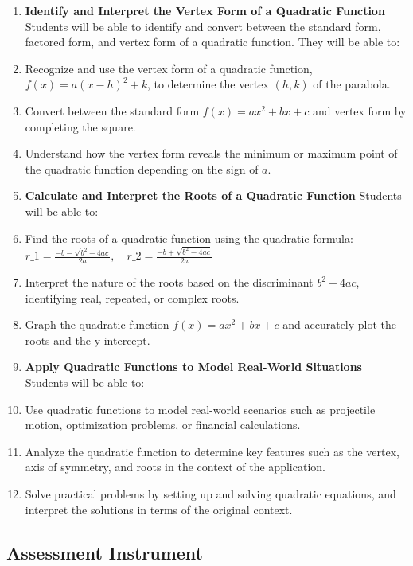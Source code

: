 \begin{enumerate}
    \item \textbf{Identify and Interpret the Vertex Form of a Quadratic Function} Students will be able to identify and convert between the standard form, factored form, and vertex form of a quadratic function. They will be able to:
    \item Recognize and use the vertex form of a quadratic function, $f(x) = a(x - h)^2 + k$, to determine the vertex $(h, k)$ of the parabola.
    \item Convert between the standard form $f(x) = ax^2 + bx + c$ and vertex form by completing the square.
    \item Understand how the vertex form reveals the minimum or maximum point of the quadratic function depending on the sign of $a$.
    \item \textbf{Calculate and Interpret the Roots of a Quadratic Function} Students will be able to:
    \item Find the roots of a quadratic function using the quadratic formula: $ r\_1 = \frac{-b - \sqrt{b^2 - 4ac}}{2a}, \quad r\_2 = \frac{-b + \sqrt{b^2 - 4ac}}{2a} $
    \item Interpret the nature of the roots based on the discriminant $b^2 - 4ac$, identifying real, repeated, or complex roots.
    \item Graph the quadratic function $f(x) = ax^2 + bx + c$ and accurately plot the roots and the y-intercept.
    \item \textbf{Apply Quadratic Functions to Model Real-World Situations} Students will be able to:
    \item Use quadratic functions to model real-world scenarios such as projectile motion, optimization problems, or financial calculations.
    \item Analyze the quadratic function to determine key features such as the vertex, axis of symmetry, and roots in the context of the application.
    \item Solve practical problems by setting up and solving quadratic equations, and interpret the solutions in terms of the original context.
\end{enumerate}

\subsection{Assessment Instrument}
\label{ssec:asse-6423}

